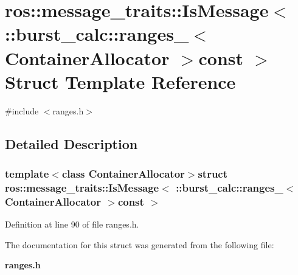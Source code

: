 \section{ros\-:\-:message\-\_\-traits\-:\-:\-Is\-Message$<$ \-:\-:burst\-\_\-calc\-:\-:ranges\-\_\-$<$ \-Container\-Allocator $>$const $>$ \-Struct \-Template \-Reference}
\label{structros_1_1message__traits_1_1IsMessage_3_01_1_1burst__calc_1_1ranges___3_01ContainerAllocator_01_4const_01_01_4}


{\ttfamily \#include $<$ranges.\-h$>$}



\subsection{\-Detailed \-Description}
\subsubsection*{template$<$class Container\-Allocator$>$struct ros\-::message\-\_\-traits\-::\-Is\-Message$<$ \-::burst\-\_\-calc\-::ranges\-\_\-$<$ Container\-Allocator $>$const  $>$}



\-Definition at line 90 of file ranges.\-h.



\-The documentation for this struct was generated from the following file\-:\begin{DoxyCompactItemize}
\item 
{\bf ranges.\-h}\end{DoxyCompactItemize}
